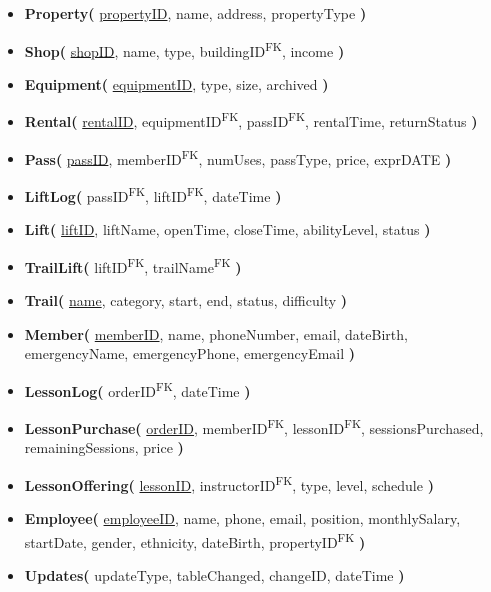 \documentclass[11pt]{scrartcl}
\begin{document}
\begin{itemize}
  \item \textbf{Property(} \underline{propertyID}, name, address, propertyType \textbf{)}

  \item \textbf{Shop(} \underline{shopID}, name, type, buildingID\textsuperscript{FK}, income \textbf{)}

  \item \textbf{Equipment(} \underline{equipmentID}, type, size, archived \textbf{)}

  \item \textbf{Rental(} \underline{rentalID}, equipmentID\textsuperscript{FK}, passID\textsuperscript{FK}, rentalTime, returnStatus \textbf{)}

  \item \textbf{Pass(} \underline{passID}, memberID\textsuperscript{FK}, numUses, passType, price, exprDATE \textbf{)}

  \item \textbf{LiftLog(} passID\textsuperscript{FK}, liftID\textsuperscript{FK}, dateTime \textbf{)}

  \item \textbf{Lift(} \underline{liftID}, liftName, openTime, closeTime, abilityLevel, status \textbf{)}

  \item \textbf{TrailLift(} liftID\textsuperscript{FK}, trailName\textsuperscript{FK} \textbf{)}

  \item \textbf{Trail(} \underline{name}, category, start, end, status, difficulty \textbf{)}

  \item \textbf{Member(} \underline{memberID}, name, phoneNumber, email, dateBirth, emergencyName, emergencyPhone, emergencyEmail \textbf{)}

  \item \textbf{LessonLog(} orderID\textsuperscript{FK}, dateTime \textbf{)}

  \item \textbf{LessonPurchase(} \underline{orderID}, memberID\textsuperscript{FK}, lessonID\textsuperscript{FK}, sessionsPurchased, remainingSessions, price \textbf{)}

  \item \textbf{LessonOffering(} \underline{lessonID}, instructorID\textsuperscript{FK}, type, level, schedule \textbf{)}

  \item \textbf{Employee(} \underline{employeeID}, name, phone, email, position, monthlySalary, startDate, gender, ethnicity, dateBirth, propertyID\textsuperscript{FK} \textbf{)}

  \item \textbf{Updates(} updateType, tableChanged, changeID, dateTime \textbf{)}
\end{itemize}
\end{document}

